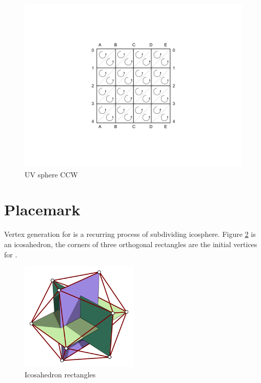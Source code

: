 \begin{figure}[H]
\caption{UV sphere CCW}
\label{fig:uv-sphere-ccw}
\centering
\includegraphics[width=\textwidth, keepaspectratio]{Figures/uv-sphere-ccw.png}
\decoRule
\end{figure}

\section{Placemark}

Vertex generation for  is a recurring process of subdividing icosphere. Figure \ref{fig:icosahedron-rectangles} is an icosahedron, the corners of three orthogonal rectangles are the initial vertices for .

\begin{figure}[H]
\caption[Icosahedron rectangles]{Icosahedron rectangles \cite{wiki.icosahedron-rectangles.2006}}
\label{fig:icosahedron-rectangles}
\centering
\includegraphics[width=0.5\textwidth, keepaspectratio]{Figures/icosahedron-rectangles.png}
\decoRule
\end{figure}

